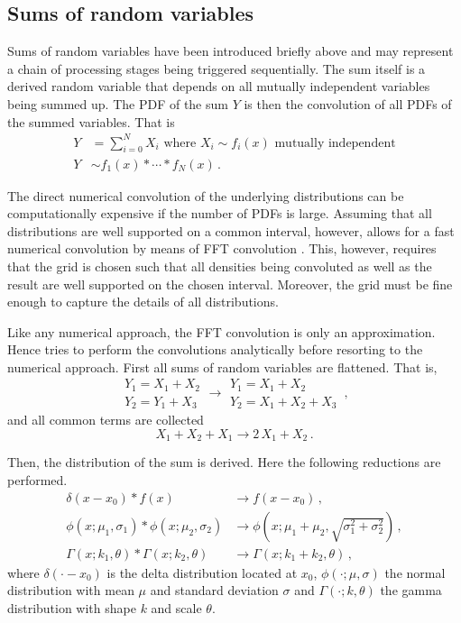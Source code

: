 \subsection{Sums of random variables}
Sums of random variables have been introduced briefly above and may represent a chain of processing
stages being triggered sequentially. The sum itself is a derived random variable that depends on all
mutually independent variables being summed up. The PDF of the sum $Y$ is then the convolution of all
PDFs of the summed variables. That is
\begin{align}
 Y &= \sum_{i=0}^NX_i\text{ where } X_i \sim f_i(x)\text{ mutually independent} \nonumber \\
 Y &\sim f_1(x) \ast \cdots \ast f_N(x)\,. \nonumber
\end{align}

The direct numerical convolution of the underlying distributions can be computationally expensive if the
number of PDFs is large. Assuming that all distributions are well supported on a common interval, however, 
allows for a fast numerical convolution by means of FFT convolution \cite[e.g., ][]{Press2007}. 
This, however, requires that the grid is chosen such that all densities being
convoluted as well as the result are well supported on the chosen interval. Moreover, the grid must be fine 
enough to capture the details of all distributions. 

Like any numerical approach, the FFT convolution is only an approximation. Hence 
tries to perform the convolutions analytically before resorting to the numerical approach. First
all sums of random variables are flattened. That is, 
\begin{equation}
 \begin{array}{l}
  Y_1 = X_1 + X_2\\
  Y_2 = Y_1 + X_3 
 \end{array} \longrightarrow 
 \begin{array}{l}
  Y_1 = X_1 + X_2\\
  Y_2 = X_1 + X_2 + X_3 
 \end{array}\,, \nonumber
\end{equation}
and all common terms are collected
\begin{equation}
 X_1+X_2+X_1 \longrightarrow 2\,X_1+X_2\,. \nonumber
\end{equation}

Then, the distribution of the sum is derived. Here the following reductions are performed.
\begin{align}
 \delta(x-x_0)\ast f(x) &\longrightarrow f(x-x_0)\,, \nonumber \\
 \phi(x; \mu_1, \sigma_1)\ast \phi(x; \mu_2, \sigma_2) &\longrightarrow 
   \phi(x; \mu_1+\mu_2, \sqrt{\sigma_1^2+\sigma_2^2}) \nonumber\,, \\
 \Gamma(x; k_1, \theta)\ast \Gamma(x; k_2, \theta) &\longrightarrow 
   \Gamma(x; k_1+k_2, \theta)\,, \nonumber
\end{align}
where $\delta(\cdot-x_0)$ is the delta distribution located at $x_0$, $\phi(\cdot; \mu, \sigma)$ 
the normal distribution with mean $\mu$ and standard deviation $\sigma$ and 
$\Gamma(\cdot; k, \theta)$ the gamma distribution with shape $k$ and scale $\theta$.

